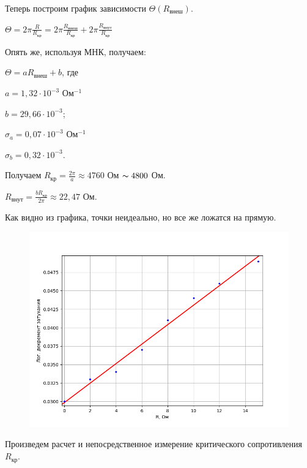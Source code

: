 \documentclass[a4paper,12pt]{article} %
\begin{document}
Теперь построим график зависимости $\Theta(R_{\text{внеш}})$.

$\Theta = 2\pi \frac{R}{R_{\text{кр}}} = 2\pi \frac{R_{\text{внеш}}}{R_{\text{кр}}} + 2\pi\frac{R_{\text{внут}}}{R_{\text{кр}}}$

Опять же, используя МНК, получаем:

\noindent $\Theta = aR_{\text{внеш}} + b$, где

\noindent $a = 1,32 \cdot 10^{-3} $ Ом$^{-1}$ 

\noindent $b = 29,66 \cdot 10^{-3}$;

\noindent $\sigma_a = 0,07 \cdot 10^{-3} $ Ом$^{-1}$ 

\noindent $\sigma_b = 0,32 \cdot 10^{-3}$.
\vspace{7mm}

\noindent Получаем $R_{\text{кр}} = \frac{2\pi}{a} \approx 4760$ Ом $\thicksim 4800$  Ом.

\noindent $R_{\text{внут}} = \frac{bR_{\text{кр}}}{2\pi} \approx 22,47$ Ом.

\noindent Как видно из графика, точки неидеально, но все же ложатся на прямую.

\newpage

\begin{figure}[h!]
	\begin{center}
		\includegraphics[scale=0.85]{Pictures/Q(R).png}
	\end{center}
\end{figure}

Произведем расчет и непосредственное измерение критического сопротивления $R_{\text{кр}}$.
\end{document}
